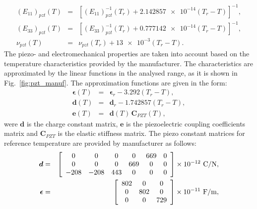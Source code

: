 \begin{eqnarray}
	\left(E_{11}\right)_{pzt}(T) & = & \left[\left(E_{11}\right)^{-1}_{pzt}(T_r) + \num{2.142857e-14}(T_r-T)\right]^{-1},\\
	\left(E_{33}\right)_{pzt}(T) & = & \left[\left(E_{33}\right)^{-1}_{pzt}(T_r) + \num{0.777142e-14}(T_r-T)\right]^{-1},\\
	\nu_{pzt}(T) & = & \nu_{pzt}(T_r) + \num{13e-3}(T_r-T).
	\label{eq:pzt_temp}
\end{eqnarray}
The piezo- and electromechanical properties are taken into account based on the temperature characteristics provided by the manufacturer.
The characteristics are approximated by the linear functions in the analysed range, as it is shown in Fig.~\ref{fig:pzt_manuf}.
The approximation functions are given in the form:
\begin{eqnarray}
	\boldsymbol{\epsilon}(T) & = & \boldsymbol{\epsilon}_r - 3.292(T_r-T),\\
	\boldsymbol{d}(T) & = & \boldsymbol{d}_r - \num{1.742857}(T_r-T),\\
	\boldsymbol{e}(T) & = & \boldsymbol{d}(T)\,\boldsymbol{C}_{PZT}(T),
	\label{eq:piezo_temp}
\end{eqnarray}
were \(\boldsymbol{d}\) is the charge constant matrix, \(\boldsymbol{e}\) is the piezoelectric coupling coefficients matrix and \(\boldsymbol{C}_{PZT}\) is the elastic stiffness matrix.
The piezo constant matrices for reference temperature are provided by manufacturer as follows:
\begin{eqnarray}
	\boldsymbol{d} & = & \left[
	\begin{array}{cccccc}
	0 & 0 & 0 & 0 & 669 & 0\\
	0 & 0 & 0 & 669 & 0 & 0\\
	-208 & -208 & 443 & 0 & 0 & 0\\
	\end{array}\right] \times10^{-12}\ \unit[per-mode = symbol]{\coulomb\per\newton},\\
	\boldsymbol{\epsilon} & = & \left[
	\begin{array}{ccc}
	802 & 0 & 0\\
	0 & 802 & 0\\
	0 & 0 & 729\\
\end{array}\right] \times10^{-11}\ \unit[per-mode = symbol]{\farad\per\meter},
\end{eqnarray}

